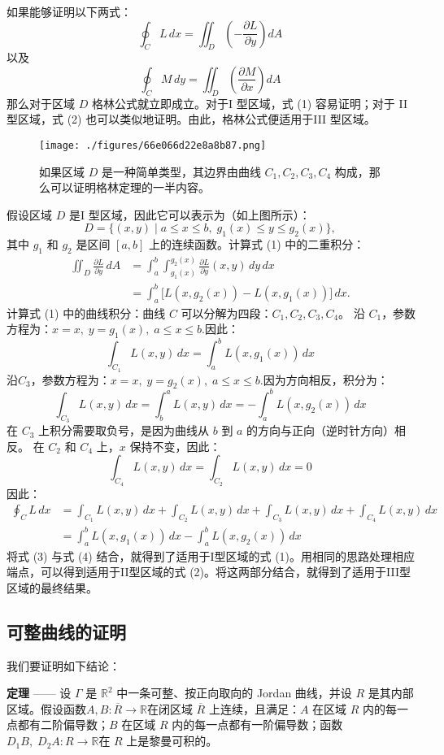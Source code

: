 如果能够证明以下两式：
$$
\oint_{C} L\,dx = \iint_{D} \left( -\frac{\partial L}{\partial y} \right) dA
\tag{1}~
$$
以及
$$
\oint_{C} M\,dy = \iint_{D} \left( \frac{\partial M}{\partial x} \right) dA
\tag{2}~
$$
那么对于区域 $D$ 格林公式就立即成立。对于I 型区域，式 (1) 容易证明；对于 II 型区域，式 (2) 也可以类似地证明。由此，格林公式便适用于III 型区域。
\begin{figure}[ht]
\centering
\texttt{[image: ./figures/66e066d22e8a8b87.png]}
\caption{如果区域 $D$ 是一种简单类型，其边界由曲线 $C_1, C_2, C_3, C_4$ 构成，那么可以证明格林定理的一半内容。} \label{fig_GLgs_1}
\end{figure}
假设区域 $D$ 是I 型区域，因此它可以表示为（如上图所示）：
$$
D = \{(x, y) \mid a \leq x \leq b, \; g_1(x) \leq y \leq g_2(x)\},~
$$
其中 $g_1$ 和 $g_2$ 是区间 $[a, b]$ 上的连续函数。计算式 (1) 中的二重积分：
$$
\begin{aligned}
\iint_D \frac{\partial L}{\partial y} \, dA
&= \int_a^b \int_{g_1(x)}^{g_2(x)} \frac{\partial L}{\partial y}(x, y) \, dy \, dx \\
&= \int_a^b \big[ L(x, g_2(x)) - L(x, g_1(x)) \big] \, dx.
\end{aligned}
\tag{3}~
$$
计算式 (1) 中的曲线积分：曲线 $C$ 可以分解为四段：$C_1, C_2, C_3, C_4$。
沿 $C_1$，参数方程为：$x = x,\; y = g_1(x),\; a \leq x \leq b$.因此：
  $$
  \int_{C_1} L(x, y) \, dx
  = \int_a^b L(x, g_1(x)) \, dx~
  $$
沿$C_3$，参数方程为：$x = x,\; y = g_2(x),\; a \leq x \leq b$.因为方向相反，积分为：
  $$
  \int_{C_3} L(x, y) \, dx
  = \int_b^a L(x, y) \, dx
  = -\int_a^b L(x, g_2(x)) \, dx~
  $$
在 $C_3$ 上积分需要取负号，是因为曲线从 $b$ 到 $a$ 的方向与正向（逆时针方向）相反。
在 $C_2$ 和 $C_4$ 上，$x$ 保持不变，因此：
$$
\int_{C_4} L(x, y)\, dx = \int_{C_2} L(x, y)\, dx = 0~
$$
因此：
$$
\begin{aligned}
\oint_{C} L\, dx
&= \int_{C_1} L(x, y)\, dx
 + \int_{C_2} L(x, y)\, dx
 + \int_{C_3} L(x, y)\, dx
 + \int_{C_4} L(x, y)\, dx \\
&= \int_a^b L(x, g_1(x))\, dx
 - \int_a^b L(x, g_2(x))\, dx
\end{aligned}
\tag{4}~
$$
将式 (3) 与式 (4) 结合，就得到了适用于I型区域的式 (1)。用相同的思路处理相应端点，可以得到适用于II型区域的式 (2)。将这两部分结合，就得到了适用于III型区域的最终结果。
\subsection{可整曲线的证明}
我们要证明如下结论：

\textbf{定理} —— 设 $\Gamma$ 是 $\mathbb{R}^2$ 中一条可整、按正向取向的 Jordan 曲线，并设 $R$ 是其内部区域。假设函数$A, B : \overline{R} \to \mathbb{R}$在闭区域 $\overline{R}$ 上连续，且满足：$A$ 在区域 $R$ 内的每一点都有二阶偏导数；$B$ 在区域 $R$ 内的每一点都有一阶偏导数；函数$
D_1 B, \; D_2 A : R \to \mathbb{R}$在 $R$ 上是黎曼可积的。


